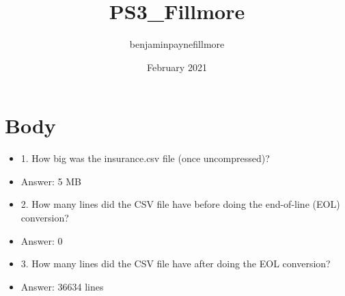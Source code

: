 \documentclass{article}
\title{PS3_Fillmore}
\author{benjaminpaynefillmore }
\date{February 2021}
\begin{document}
\maketitle

\section{Body}

\begin{itemize}
    \item 1. How big was the insurance.csv file (once uncompressed)? 
    \item Answer: 5 MB
    \item 2. How many lines did the CSV file have before doing the end-of-line (EOL) conversion? 
    \item Answer: 0
    \item 3. How many lines did the CSV file have after doing the EOL conversion? 
    \item Answer: 36634 lines
\end{itemize}
\end{document}
